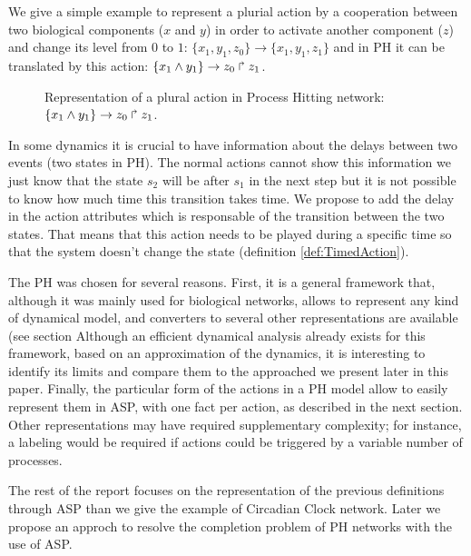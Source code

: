 \begin{example}
We give a simple example to represent a plurial action by a cooperation between two biological components ($x$ and $y$) in order to activate another component ($z$) and change its level from $0$ to $1$: $\{x_1, y_1, z_0 \} \rightarrow \{x_1, y_1, z_1 \} $ and in PH it can be translated by this action: $\{x_1 \wedge y_1\}\rightarrow z_0\Rsh z_1 $.

\begin{figure}[ht]
\label{fig:ph-plurial} 
\centering
{}
\caption{
Representation of a plural action in Process Hitting network: $\{x_1 \wedge y_1\}\rightarrow z_0\Rsh z_1 $.
}

\end{figure}
\end{example}

In some dynamics it is crucial to have information about the delays between two events (two states in PH). The normal actions cannot show this information we just know that the state $s_2$ will be after $s_1$ in the next step but it is not possible to know how much time this transition takes time. We propose to add the delay in the action attributes which is responsable of the transition between the two states. That means that this action needs to be played during a specific time so that the system doesn't change the state (definition \ref{def:TimedAction}).

\begin{definition}
\label{def:TimedAction}

\end{definition}

\begin{definition}
\label{def:TempSort}

\end{definition}

The PH was chosen for several reasons.
First, it is a general framework that,
although it was mainly used for biological networks,
allows to represent any kind of dynamical model,
and converters to several other representations are available (see section%
Although an efficient dynamical analysis already exists for this framework,
based on an approximation of the dynamics,
it is interesting to identify its limits
and compare them to the approached we present later in this paper.
Finally, the particular form of the actions in a PH model allow
to easily represent them in ASP,
with one fact per action, as described in the next section.
Other representations may have required supplementary complexity;
for instance, a labeling would be required
if actions could be triggered by a variable number of processes.



The rest of the report focuses on the representation of the previous definitions through ASP than we give the example of Circadian Clock network. Later we propose an approch to resolve the completion problem of PH networks with the use of ASP.


